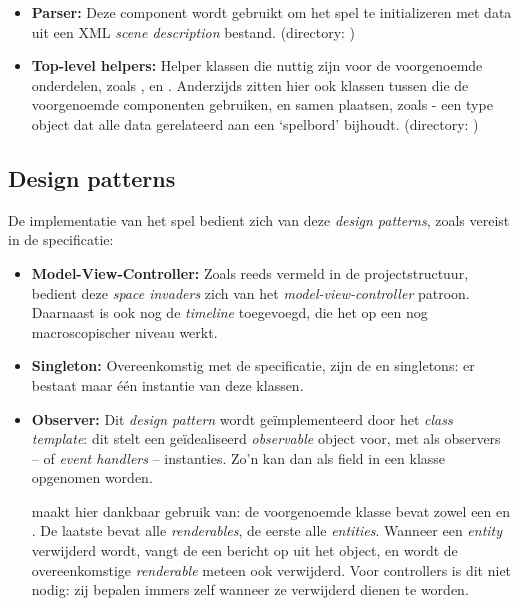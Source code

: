\documentclass[10pt,a4paper]{article}
\begin{document}
\begin{itemize}
\item \textbf{Parser:} Deze component wordt gebruikt om het spel te initializeren
met data uit een XML \emph{scene description} bestand.
(directory: )

\item \textbf{Top-level helpers:} Helper klassen die nuttig zijn voor de 
voorgenoemde onderdelen, zoals ,  en . 
Anderzijds zitten hier ook klassen tussen die de voorgenoemde componenten
gebruiken, en samen plaatsen, zoals  - een type object
dat alle data gerelateerd aan een `spelbord' bijhoudt.
(directory: )

\end{itemize}

\subsection{Design patterns}

De implementatie van het spel bedient zich van deze \emph{design patterns}, zoals vereist in de specificatie:

\begin{itemize}
	
\item \textbf{Model-View-Controller:} Zoals reeds vermeld in de 
projectstructuur,
bedient deze \emph{space invaders} zich van het \emph{model-view-controller}
patroon. Daarnaast is ook nog de \emph{timeline} toegevoegd, die het op een
nog macroscopischer niveau werkt.

\item \textbf{Singleton:} Overeenkomstig met de specificatie, zijn 
de  en  singletons: er bestaat maar \'e\'en instantie van deze klassen.

\item \textbf{Observer:} Dit \emph{design pattern} wordt ge\"implementeerd
door het  \emph{class template}: dit stelt een 
ge\"idealiseerd \emph{observable} object voor, met als 
observers -- of \emph{event handlers} -- 
 instanties. 
Zo'n  kan dan als field in een klasse opgenomen worden. 

 maakt hier dankbaar gebruik van: de voorgenoemde 
klasse bevat zowel een  en . 
De laatste bevat alle \emph{renderables}, de eerste alle \emph{entities}.
Wanneer een \emph{entity} verwijderd wordt, vangt de 
een bericht op uit het  object, en wordt de overeenkomstige
\emph{renderable} meteen ook verwijderd. Voor controllers is dit niet nodig:
zij bepalen immers zelf wanneer ze verwijderd dienen te worden.


\end{itemize}
\end{document}
